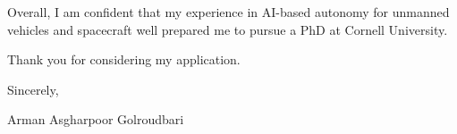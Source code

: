 \documentclass[a4,20pt]{article}
\begin{document}
\begin{large}
Overall, I am confident that my experience in AI-based autonomy for unmanned vehicles and spacecraft well prepared me to pursue a PhD at Cornell University.

Thank you for considering my application.

Sincerely,

Arman Asgharpoor Golroudbari


\end{large}
\end{document}
